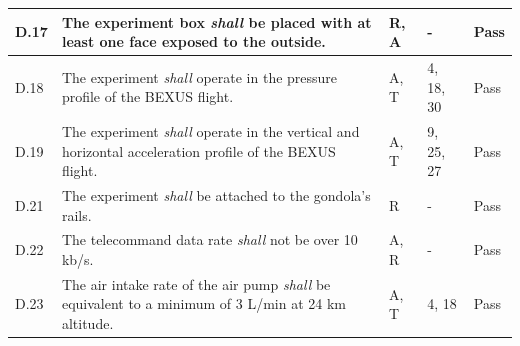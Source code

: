 \documentclass[a4paper,12pt,oneside]{article}
\begin{document}
\begin{longtable}[]{|m{}| m{} |m{} |m{}|m{}|}
D.17 & The experiment box \textit{shall} be placed with at least one face exposed to the outside.                                                                                &     R, A         & -            &   Pass      
\\ \hline %
D.18 & The  experiment \textit{shall} operate  in  the  pressure  profile  of  the BEXUS flight.\cite{BexusManual}                                                                              &    A, T         & 4, 18, 30 &  Pass
\\ \hline
D.19 & The  experiment \textit{shall} operate  in  the  vertical  and  horizontal  acceleration  profile  of  the BEXUS flight.\cite{BexusManual}                                                                              &    A, T         & 9, 25, 27            &   Pass   
\\ \hline
D.21 & The experiment \textit{shall} be attached to the gondola’s rails.                                                                                &     R         & -            &  Pass
\\ \hline %
D.22 & The telecommand data rate \textit{shall} not be over 10 kb/s.                                                                               &     A, R         & -            &    Pass
\\  \hline%

D.23 & The air intake rate of the air pump \textit{shall} be equivalent to a minimum of 3 L/min at 24 km altitude.                                                                                                                        &       A, T        & 4, 18            &  Pass      \\ \hline


\end{longtable}
\end{document}
